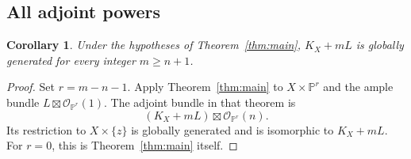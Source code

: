 \documentclass[11pt]{article}
\numberwithin{equation}{section}
\newtheorem{corollary}[theorem]{Corollary}
\theoremstyle{definition}
\theoremstyle{remark}
\newcommand{\cO}{\mathcal O}
\begin{document}







\subsection{All adjoint powers}
\begin{corollary}\label{cor:all-powers}
Under the hypotheses of Theorem~\ref{thm:main}, $K_X+mL$ is globally
generated for every integer $m\geq n+1$.
\end{corollary}
\begin{proof}
Set $r=m-n-1$. Apply Theorem~\ref{thm:main} to
$X\times\mathbb P^r$ and the ample bundle
$L\boxtimes\cO_{\mathbb P^r}(1)$. The adjoint bundle in that theorem is
\[
 (K_X+mL)\boxtimes\cO_{\mathbb P^r}(n).
\]
Its restriction to $X\times\{z\}$ is globally generated and is isomorphic
to $K_X+mL$. For $r=0$, this is Theorem~\ref{thm:main} itself.
\end{proof}

\begingroup
\small
\setlength{\bibsep}{3pt}

\endgroup
\end{document}

